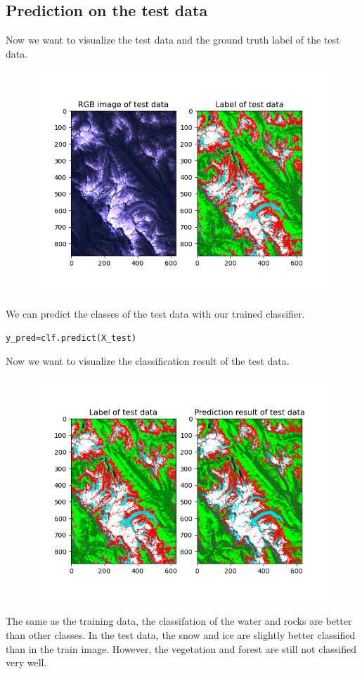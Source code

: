 \documentclass[12pt
,headinclude
,headsepline
,bibtotocnumbered
]{scrartcl}
\begin{document}
\subsection*{Prediction on the test data}
Now we want to visualize the test data and the ground truth label of the test data.
\begin{figure}[H]
\centering
\includegraphics[width=1\textwidth]{plots/test.png}
\end{figure}
We can predict the classes of the test data with our trained classifier.
\begin{lstlisting}[breaklines=true]
    y_pred=clf.predict(X_test)
\end{lstlisting}
Now we want to visualize the classification result of the test data.
\begin{figure}[H]
\centering
\includegraphics[width=1\textwidth]{plots/test_result.png}
\end{figure}
The same as the training data, the classifation of the water and rocks are better than other classes. In the test data, the snow and ice are slightly better classified than in the train image. However, the vegetation and forest are still not classified very well. 
\end{document}
